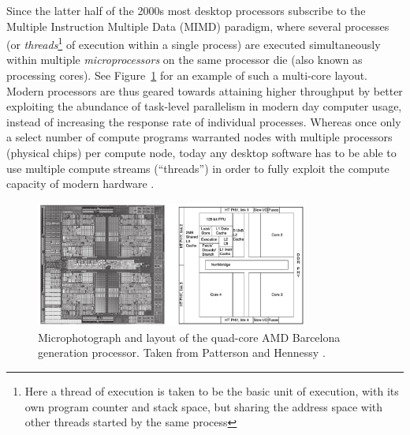 Since the latter half of the 2000s most desktop processors subscribe to the Multiple Instruction Multiple Data (MIMD) paradigm, where several processes 
(or \textit{threads}\footnote{Here a thread of execution is taken to be the basic unit of execution, with its own program counter and stack space, but sharing the address space with other threads started by the same process} of execution 
within a single process) are executed simultaneously within multiple \textit{microprocessors} on the same processor die (also known as processing cores). 
See Figure~\ref{fig_amd_barcelona_arch} for an example of such a multi-core layout. Modern processors are thus geared towards attaining higher throughput by better exploiting the 
abundance of task-level parallelism in modern day computer usage, instead of increasing the response rate of individual processes. Whereas once only a select number of compute 
programs warranted nodes with multiple processors (physical chips) per compute node, today any desktop software has to be able to use multiple compute streams (``threads'') 
in order to fully exploit the compute capacity of modern hardware \cite{patterson2009computer} \cite{akhter2006multi}. 
\begin{figure}[ht!]
 \begin{mdframed}
  \centering
  \includegraphics[width=0.8\textwidth]{images/amd_barcelona.png}
  \caption[AMD Barcelona]{Microphotograph and layout of the quad-core AMD Barcelona generation processor. Taken from Patterson and Hennessy \cite[ch. 1]{patterson2009computer}.}
  \label{fig_amd_barcelona_arch}
 \end{mdframed}
\end{figure}

